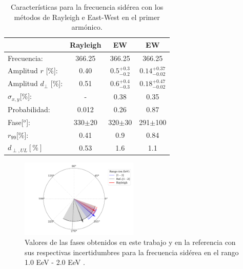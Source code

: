    \begin{table}[H]
        \begin{small}
            \begin{center}
                \begin{tabular}[c]{l|c||c|c}
                                            & Rayleigh    & EW            & EW\cite{Aab_2020}      \\\hline
                    Frecuencia:             & 366.25	  & 366.25        & 366.25        \\
                    Amplitud $r$ [\%]:      & 0.40	      & $0.5^{+0.3}_{-0.2}$           & $0.14^{+0.37}_{-0.02}$\footnotemark[2]      \\
                    Amplitud $d_\perp$ [\%]:& 0.51        & $0.6^{+0.4}_{-0.3}$           & $0.18^{+0.47}_{-0.02}$       \\ 
                    $\sigma_{x,y}$[\%]:     & -	          & 0.38	        & 0.35          \\
                    Probabilidad:           & 0.012	      & 0.26          & 0.87          \\
                    Fase[$^o$]:             & 330$\pm$20  & 320$\pm$30    & 291$\pm$100 \footnotemark[3]     \\
                    $r_{99}$[\%]:           & 0.41	      & 0.9           & 0.84\footnotemark[2]       \\
                    $d_{\perp,UL}[\%]$      & 0.53        & 1.6           & 1.1        \\
                \end{tabular}
            \end{center}
        \end{small}
        \caption{Características para la frecuencia sidérea con los métodos de Rayleigh  e East-West en el primer armónico.}
        \label{tab:siderea_3}
    \end{table}
   
    \begin{figure}[H]
        \begin{small}
            \begin{center}
                \includegraphics[width=0.5\textwidth]{phase_tercer_bin.pdf}
            \end{center}
        \caption{Valores de las fases obtenidos en este trabajo y en la referencia con sus respectivas incertidumbres para la frecuencia sidérea en el  rango 1.0 EeV - 2.0 EeV .}
        \label{fig:tercer}
        \end{small}
    \end{figure}


